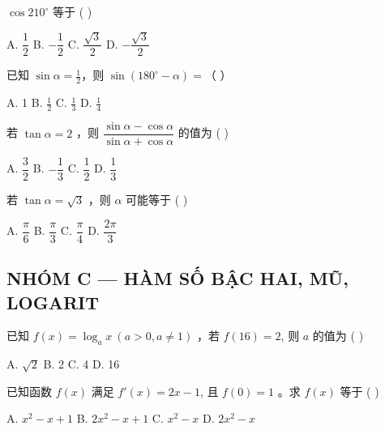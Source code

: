 \documentclass[11pt, a4paper]{article}
\begin{document}
\begin{baitap}[16]
$\cos 210^\circ$ 等于 ( )
\par\vspace{3pt}
\noindent A. $\dfrac{1}{2}$ \quad B. $-\dfrac{1}{2}$ \quad C. $\dfrac{\sqrt{3}}{2}$ \quad D. $-\dfrac{\sqrt{3}}{2}$
\end{baitap}

\begin{baitap}[17]
已知 $\sin\alpha = \frac{1}{2}$，则 $\sin(180^\circ - \alpha) =$（ ）
\par\vspace{3pt}
\noindent A. 1 \quad B. $\frac{1}{2}$ \quad C. $\frac{1}{3}$ \quad D. $\frac{1}{4}$
\end{baitap}

\begin{baitap}[18]
若 $\tan\alpha = 2$ ，则 $\dfrac{\sin\alpha - \cos\alpha}{\sin\alpha + \cos\alpha}$ 的值为 ( )
\par\vspace{3pt}
\noindent A. $\dfrac{3}{2}$ \quad B. $-\dfrac{1}{3}$ \quad C. $\dfrac{1}{2}$ \quad D. $\dfrac{1}{3}$
\end{baitap}

\begin{baitap}[19]
若 $\tan\alpha = \sqrt{3}$ ，则 $\alpha$ 可能等于 ( )
\par\vspace{3pt}
\noindent A. $\dfrac{\pi}{6}$ \quad B. $\dfrac{\pi}{3}$ \quad C. $\dfrac{\pi}{4}$ \quad D. $\dfrac{2\pi}{3}$
\end{baitap}

\subsection*{NHÓM C — HÀM SỐ BẬC HAI, MŨ, LOGARIT}

\begin{baitap}[20]
已知 $f(x) = \log_a x\ (a > 0, a \ne 1)$ ，若 $f(16) = 2$, 则 $a$ 的值为 ( )
\par\vspace{3pt}
\noindent A. $\sqrt{2}$ \quad B. 2 \quad C. 4 \quad D. 16
\end{baitap}

\begin{baitap}[21]
已知函数 $f(x)$ 满足 $f'(x) = 2x - 1$, 且 $f(0) = 1$ 。求 $f(x)$ 等于 ( )
\par\vspace{3pt}
\noindent A. $x^2 - x + 1$ \quad B. $2x^2 - x + 1$ \quad C. $x^2 - x$ \quad D. $2x^2 - x$
\end{baitap}
\end{document}
